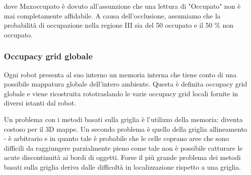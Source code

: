 dove Maxoccupato è dovuto all'assunzione che una lettura di "Occupato" non è mai completamente
affidabile.
A causa dell'occlusione, assumiamo che la probabilità di occupazione nella regione III sia del 50%
occupato e il 50 $\%$ non occupato.

\subsubsection{Occupacy grid globale}
Ogni robot presenta al suo interno un memoria interna che tiene conto di una possibile mappatura globale dell'intero ambiente. Questa è definita occupacy grid globale e viene ricostruita rototraslando le varie occupacy grid locali fornite in diversi istanti dal robot.

Un problema con i metodi basati sulla griglia è l'utilizzo della memoria: diventa costoso per il 3D
mappe. Un secondo problema è quello della griglia allineamento - è arbitrario e in quanto tale è probabile che le celle coprano aree che sono difficili da raggiungere parzialmente pieno come tale non è possibile catturare le acute discontinuità ai bordi di oggetti. Forse il più grande problema dei metodi basati sulla griglia deriva dalle difficoltà in localizzazione rispetto a una griglia.